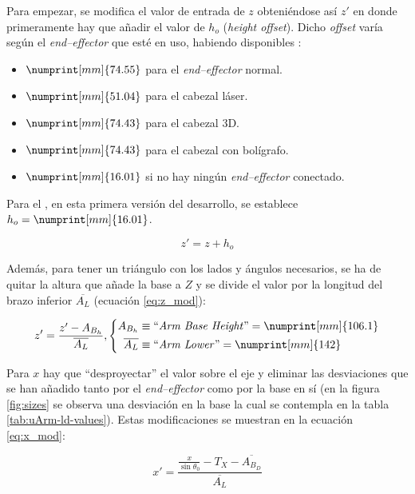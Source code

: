 Para empezar, se modifica el valor de entrada de $z$ obteniéndose así $z'$ en donde 
primeramente hay que añadir el valor de $h_o$ (\textit{height offset}). Dicho \textit{offset}
varía según el \textit{end--effector} que esté en uso, habiendo disponibles \cite{UArmDeveloperSwiftProForArduino}:

\begin{itemize}
    \item $\numprint[mm]{74.55}$ para el \textit{end--effector} normal.
    \item $\numprint[mm]{51.04}$ para el cabezal láser.
    \item $\numprint[mm]{74.43}$ para el cabezal 3D.
    \item $\numprint[mm]{74.43}$ para el cabezal con bolígrafo.
    \item $\numprint[mm]{16.01}$ si no hay ningún \textit{end--effector} conectado.
\end{itemize}

Para el \pArm{}, en esta primera versión del desarrollo, se establece $h_o = \numprint[mm]{16.01}$.

\begin{equation}
    z' = z + h_o
\end{equation}

Además, para tener un triángulo con los lados y ángulos necesarios, se ha de quitar la
altura que añade la base a $Z$ y se divide el valor por la longitud del brazo inferior
$\overline{A_L}$ (ecuación \ref{eq:z_mod}):

\begin{equation}\label{eq:z_mod}
    z' = \frac{z' - A_{B_h}}{\overline{A_L}},
    \left\{\begin{aligned}
        A_{B_h} &\equiv \text{``\textit{Arm Base Height}''} = \numprint[mm]{106.1} \\
        \overline{A_L} &\equiv \text{``\textit{Arm Lower}''} = \numprint[mm]{142}
    \end{aligned}\right.
\end{equation}

Para $x$ hay que ``desproyectar'' el valor sobre el eje y eliminar las desviaciones
que se han añadido tanto por el \textit{end--effector} como por la base en sí (en la
figura \ref{fig:sizes} se observa una desviación en la base la cual se contempla
en la tabla \ref{tab:uArm-ld-values}). Estas modificaciones se muestran en la ecuación
\ref{eq:x_mod}:

\begin{equation}\label{eq:x_mod}
    x' = \frac{\frac{x}{\sin{\theta_0}} - T_X - \overline{A_{B_D}}}{\overline{A_L}}
\end{equation}

